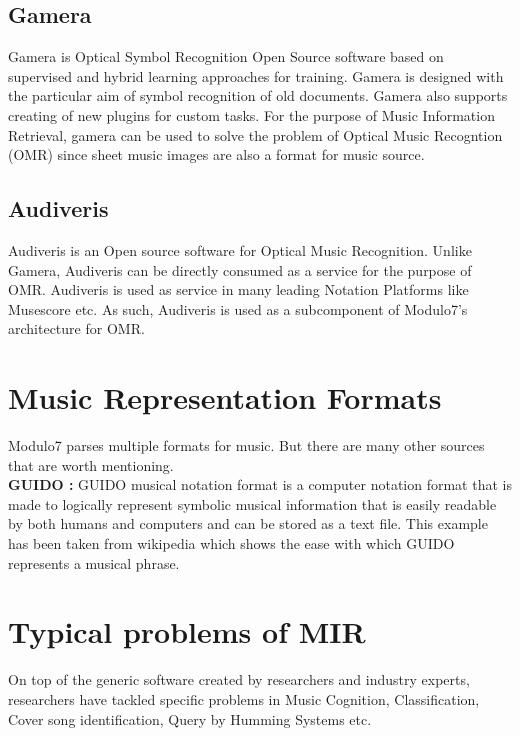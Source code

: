 \subsection{Gamera}

\noindent Gamera \cite{gamera} is Optical Symbol Recognition Open Source software based on supervised and hybrid learning approaches for training. Gamera is designed with the particular aim of symbol recognition of old documents. Gamera also supports creating of new plugins for custom tasks. For the purpose of Music Information Retrieval, gamera can be used to solve the problem of Optical Music Recogntion (OMR) since sheet music images are also a format for music source.

\subsection{Audiveris}

\noindent Audiveris is an Open source software for Optical Music Recognition. Unlike Gamera, Audiveris can be directly consumed as a service for the purpose of OMR.  Audiveris is used as service in many leading Notation Platforms like Musescore etc. As such, Audiveris is used as a subcomponent of Modulo7's architecture for OMR. 

\section{Music Representation Formats}

\noindent Modulo7 parses multiple formats for music. But there are many other sources that are worth mentioning. \\

\noindent \textbf{GUIDO :} GUIDO musical notation format is a computer notation format that is made to logically represent symbolic musical information that is easily readable by both humans and computers and can be stored as a text file. This example has been taken from wikipedia which shows the ease with which GUIDO represents a musical phrase. 


\section{Typical problems of MIR}

\noindent On top of the generic software created by researchers and industry experts, researchers have tackled specific problems in Music Cognition, Classification, Cover song identification, Query by Humming Systems etc. 
